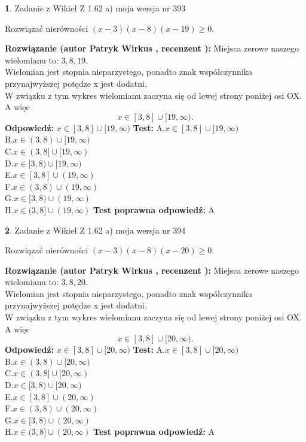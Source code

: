 \documentclass[12pt, a4paper]{article}
\theoremstyle{definition} %
\newtheorem{zad}{}
\newcommand{\zadStart}[1]{\begin{zad}#1\newline}
\newcommand{\zadStop}{\end{zad}}
\newcommand{\rozwStart}[2]{\noindent \textbf{Rozwiązanie (autor #1 , recenzent #2): }\newline}
\newcommand{\rozwStop}{\newline}
\newcommand{\odpStart}{\noindent \textbf{Odpowiedź:}\newline}
\newcommand{\odpStop}{\newline}
\newcommand{\testStart}{\noindent \textbf{Test:}\newline}
\newcommand{\testStop}{\newline}
\newcommand{\kluczStart}{\noindent \textbf{Test poprawna odpowiedź:}\newline}
\newcommand{\kluczStop}{\newline}
\begin{document}
\zadStart{Zadanie z Wikieł Z 1.62 a) moja wersja nr 393}

Rozwiązać nierówności $(x-3)(x-8)(x-19)\ge0$.
\zadStop
\rozwStart{Patryk Wirkus}{}
Miejsca zerowe naszego wielomianu to: $3, 8, 19$.\\
Wielomian jest stopnia nieparzystego, ponadto znak współczynnika przy\linebreak najwyższej potędze x jest dodatni.\\ W związku z tym wykres wielomianu zaczyna się od lewej strony poniżej osi OX. A więc $$x \in [3,8] \cup [19,\infty).$$
\rozwStop
\odpStart
$x \in [3,8] \cup [19,\infty)$
\odpStop
\testStart
A.$x \in [3,8] \cup [19,\infty)$\\
B.$x \in (3,8) \cup [19,\infty)$\\
C.$x \in (3,8] \cup [19,\infty)$\\
D.$x \in [3,8) \cup [19,\infty)$\\
E.$x \in [3,8] \cup (19,\infty)$\\
F.$x \in (3,8) \cup (19,\infty)$\\
G.$x \in [3,8) \cup (19,\infty)$\\
H.$x \in (3,8] \cup (19,\infty)$
\testStop
\kluczStart
A
\kluczStop



\zadStart{Zadanie z Wikieł Z 1.62 a) moja wersja nr 394}

Rozwiązać nierówności $(x-3)(x-8)(x-20)\ge0$.
\zadStop
\rozwStart{Patryk Wirkus}{}
Miejsca zerowe naszego wielomianu to: $3, 8, 20$.\\
Wielomian jest stopnia nieparzystego, ponadto znak współczynnika przy\linebreak najwyższej potędze x jest dodatni.\\ W związku z tym wykres wielomianu zaczyna się od lewej strony poniżej osi OX. A więc $$x \in [3,8] \cup [20,\infty).$$
\rozwStop
\odpStart
$x \in [3,8] \cup [20,\infty)$
\odpStop
\testStart
A.$x \in [3,8] \cup [20,\infty)$\\
B.$x \in (3,8) \cup [20,\infty)$\\
C.$x \in (3,8] \cup [20,\infty)$\\
D.$x \in [3,8) \cup [20,\infty)$\\
E.$x \in [3,8] \cup (20,\infty)$\\
F.$x \in (3,8) \cup (20,\infty)$\\
G.$x \in [3,8) \cup (20,\infty)$\\
H.$x \in (3,8] \cup (20,\infty)$
\testStop
\kluczStart
A
\kluczStop
\end{document}
